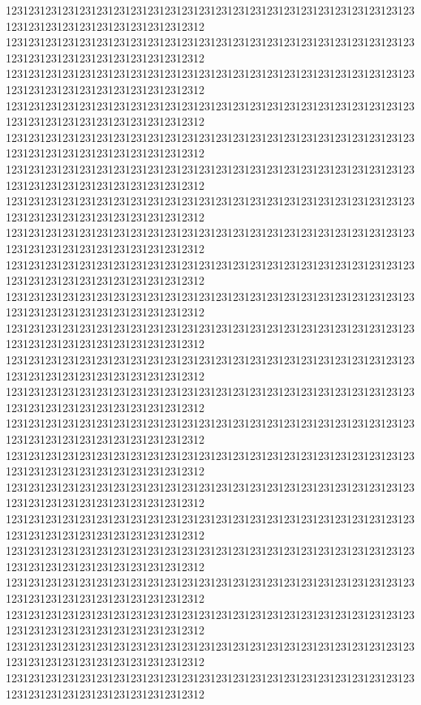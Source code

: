 \documentclass[11pt]{ctexbook}
\begin{document}

12312312312312312312312312312312312312312312312312312312312312312312312312312312312312312312312312312312312
12312312312312312312312312312312312312312312312312312312312312312312312312312312312312312312312312312312312
12312312312312312312312312312312312312312312312312312312312312312312312312312312312312312312312312312312312
12312312312312312312312312312312312312312312312312312312312312312312312312312312312312312312312312312312312
12312312312312312312312312312312312312312312312312312312312312312312312312312312312312312312312312312312312
12312312312312312312312312312312312312312312312312312312312312312312312312312312312312312312312312312312312
12312312312312312312312312312312312312312312312312312312312312312312312312312312312312312312312312312312312
12312312312312312312312312312312312312312312312312312312312312312312312312312312312312312312312312312312312
12312312312312312312312312312312312312312312312312312312312312312312312312312312312312312312312312312312312
12312312312312312312312312312312312312312312312312312312312312312312312312312312312312312312312312312312312
12312312312312312312312312312312312312312312312312312312312312312312312312312312312312312312312312312312312
12312312312312312312312312312312312312312312312312312312312312312312312312312312312312312312312312312312312
12312312312312312312312312312312312312312312312312312312312312312312312312312312312312312312312312312312312
12312312312312312312312312312312312312312312312312312312312312312312312312312312312312312312312312312312312
12312312312312312312312312312312312312312312312312312312312312312312312312312312312312312312312312312312312
12312312312312312312312312312312312312312312312312312312312312312312312312312312312312312312312312312312312
12312312312312312312312312312312312312312312312312312312312312312312312312312312312312312312312312312312312
12312312312312312312312312312312312312312312312312312312312312312312312312312312312312312312312312312312312
12312312312312312312312312312312312312312312312312312312312312312312312312312312312312312312312312312312312
12312312312312312312312312312312312312312312312312312312312312312312312312312312312312312312312312312312312
12312312312312312312312312312312312312312312312312312312312312312312312312312312312312312312312312312312312
12312312312312312312312312312312312312312312312312312312312312312312312312312312312312312312312312312312312
\end{document}
